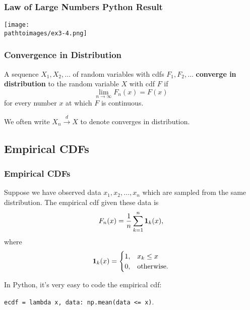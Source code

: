 \documentclass{beamer}
\newcommand{\pathtoimages}{/Users/charlesrambo/Desktop/Bootcamp24/Images}
\begin{document}
\begin{frame}
\frametitle{Law of Large Numbers Python Result}
\begin{center}
\texttt{[image: \\pathtoimages/ex3-4.png]}
\end{center}
\end{frame}

\begin{frame}
\frametitle{Convergence in Distribution}
\begin{Definition}
A sequence $X_1, X_2,\ldots$ of random variables with cdfs $F_1, F_2,\ldots$ {\bf converge in distribution} to the random variable $X$ with cdf $F$ if
$$
\lim_{n\to\infty} F_n(x) = F(x)
$$
for every number $x$ at which $F$ is continuous. 
\end{Definition}
We often write $X_n \stackrel{d}{\longrightarrow} X$ to denote converges in distribution.
\end{frame}

\subsection{Empirical CDFs}

\begin{frame}
\frametitle{Empirical CDFs}
\small
\begin{Definition}
Suppose we have observed data $x_1, x_2, \ldots, x_n$ which are sampled from the same distribution. The empirical cdf given these data is
$$
F_n(x) = \frac{1}{n} \sum_{k = 1}^n {\bf 1}_k (x),
$$
where
$$
 {\bf 1}_k(x) = \begin{cases} 1,	&	x _k\leq x\\ 0,&	\text{otherwise.}\end{cases}
$$
\end{Definition}
In Python, it's very easy to code the empirical cdf:
\begin{center} 
\texttt{ecdf = lambda x, data: np.mean(data <= x)}.
\end{center}
\end{frame}
\end{document}
